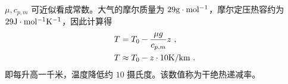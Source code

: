 $\mu,c_{p,m}$ 可近似看成常数。大气的摩尔质量为 $29 \rm{g\cdot mol^{-1}}$，摩尔定压热容约为 $29 \rm{J\cdot mol^{-1}K^{-1}}$，因此计算得
\begin{equation}
\begin{aligned}
&T=T_0-\frac{\mu g}{c_{p,m}} z~,\\
&T\approx T_0-z\cdot 10 \rm{K/km}~.
\end{aligned}
\end{equation}
即每升高一千米，温度降低约 $10$ 摄氏度。该数值称为干绝热递减率。
